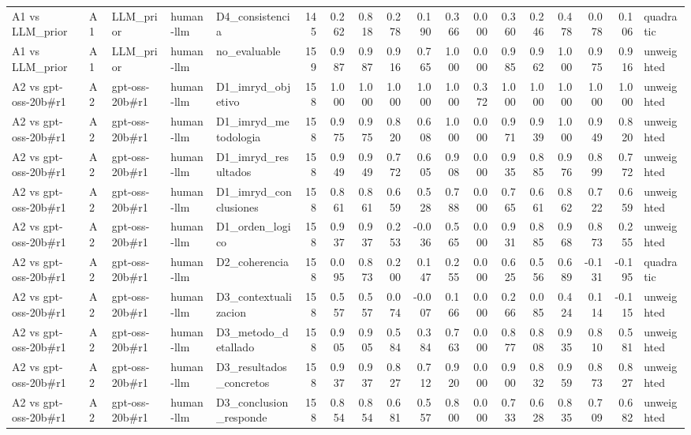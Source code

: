 \begin{table}
{\begin{tabular}{lllllrrrrrrrrrrrrl}
A1 vs LLM\_prior & A1 & LLM\_prior & human-llm & D4\_consistencia & 145 & 0.262 & 0.818 & 0.278 & 0.190 & 0.366 & 0.000 & 0.360 & 0.246 & 0.478 & 0.078 & 0.106 & quadratic \\
A1 vs LLM\_prior & A1 & LLM\_prior & human-llm & no\_evaluable & 159 & 0.987 & 0.987 & 0.916 & 0.765 & 1.000 & 0.000 & 0.985 & 0.962 & 1.000 & 0.975 & 0.916 & unweighted \\
A2 vs gpt-oss-20b\#r1 & A2 & gpt-oss-20b\#r1 & human-llm & D1\_imryd\_objetivo & 158 & 1.000 & 1.000 & 1.000 & 1.000 & 1.000 & 0.372 & 1.000 & 1.000 & 1.000 & 1.000 & 1.000 & unweighted \\
A2 vs gpt-oss-20b\#r1 & A2 & gpt-oss-20b\#r1 & human-llm & D1\_imryd\_metodologia & 158 & 0.975 & 0.975 & 0.820 & 0.608 & 1.000 & 0.000 & 0.971 & 0.939 & 1.000 & 0.949 & 0.820 & unweighted \\
A2 vs gpt-oss-20b\#r1 & A2 & gpt-oss-20b\#r1 & human-llm & D1\_imryd\_resultados & 158 & 0.949 & 0.949 & 0.772 & 0.605 & 0.908 & 0.000 & 0.935 & 0.885 & 0.976 & 0.899 & 0.772 & unweighted \\
A2 vs gpt-oss-20b\#r1 & A2 & gpt-oss-20b\#r1 & human-llm & D1\_imryd\_conclusiones & 158 & 0.861 & 0.861 & 0.659 & 0.528 & 0.788 & 0.000 & 0.765 & 0.661 & 0.862 & 0.722 & 0.659 & unweighted \\
A2 vs gpt-oss-20b\#r1 & A2 & gpt-oss-20b\#r1 & human-llm & D1\_orden\_logico & 158 & 0.937 & 0.937 & 0.253 & -0.036 & 0.565 & 0.000 & 0.931 & 0.885 & 0.968 & 0.873 & 0.255 & unweighted \\
A2 vs gpt-oss-20b\#r1 & A2 & gpt-oss-20b\#r1 & human-llm & D2\_coherencia & 158 & 0.095 & 0.873 & 0.200 & 0.147 & 0.255 & 0.000 & 0.625 & 0.556 & 0.689 & -0.131 & -0.195 & quadratic \\
A2 vs gpt-oss-20b\#r1 & A2 & gpt-oss-20b\#r1 & human-llm & D3\_contextualizacion & 158 & 0.557 & 0.557 & 0.074 & -0.007 & 0.166 & 0.000 & 0.266 & 0.085 & 0.424 & 0.114 & -0.115 & unweighted \\
A2 vs gpt-oss-20b\#r1 & A2 & gpt-oss-20b\#r1 & human-llm & D3\_metodo\_detallado & 158 & 0.905 & 0.905 & 0.584 & 0.384 & 0.763 & 0.000 & 0.877 & 0.808 & 0.935 & 0.810 & 0.581 & unweighted \\
A2 vs gpt-oss-20b\#r1 & A2 & gpt-oss-20b\#r1 & human-llm & D3\_resultados\_concretos & 158 & 0.937 & 0.937 & 0.827 & 0.712 & 0.920 & 0.000 & 0.900 & 0.832 & 0.959 & 0.873 & 0.827 & unweighted \\
A2 vs gpt-oss-20b\#r1 & A2 & gpt-oss-20b\#r1 & human-llm & D3\_conclusion\_responde & 158 & 0.854 & 0.854 & 0.681 & 0.557 & 0.800 & 0.000 & 0.733 & 0.628 & 0.835 & 0.709 & 0.682 & unweighted \\

\end{tabular}}
\end{table}

